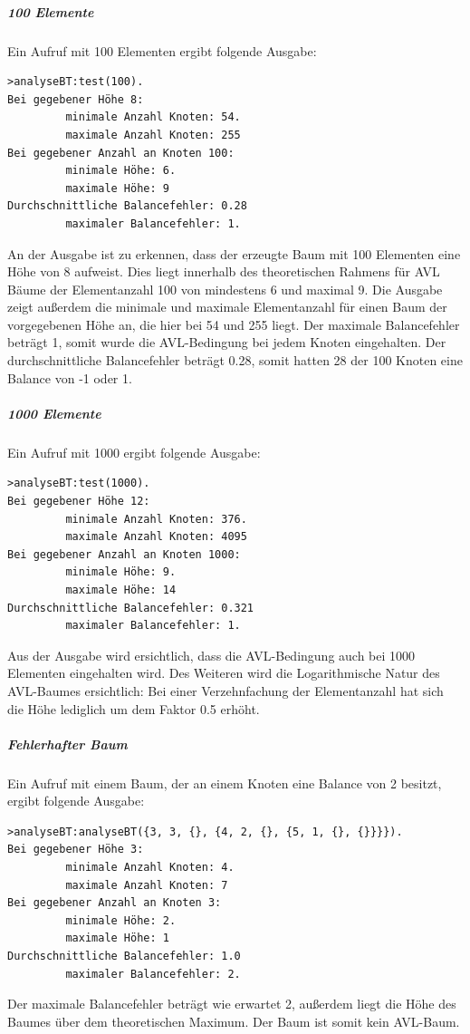 \subparagraph{100 Elemente}
Ein Aufruf mit 100 Elementen ergibt folgende Ausgabe:
\begin{verbatim}
>analyseBT:test(100).
Bei gegebener Höhe 8:
         minimale Anzahl Knoten: 54.
         maximale Anzahl Knoten: 255
Bei gegebener Anzahl an Knoten 100:
         minimale Höhe: 6.
         maximale Höhe: 9
Durchschnittliche Balancefehler: 0.28
         maximaler Balancefehler: 1.
\end{verbatim}

An der Ausgabe ist zu erkennen, dass der erzeugte Baum mit 100 Elementen eine Höhe von 8
aufweist.
Dies liegt innerhalb des theoretischen Rahmens für AVL Bäume der Elementanzahl 100 von mindestens
6 und maximal 9.
Die Ausgabe zeigt außerdem die minimale und maximale Elementanzahl für einen Baum der
vorgegebenen Höhe an, die hier bei 54 und 255 liegt.
Der maximale Balancefehler beträgt 1, somit wurde die AVL-Bedingung bei jedem Knoten eingehalten.
Der durchschnittliche Balancefehler beträgt 0.28, somit hatten 28 der 100 Knoten eine Balance
von -1 oder 1.

\subparagraph{1000 Elemente}
Ein Aufruf mit 1000 ergibt folgende Ausgabe:
\begin{verbatim}
>analyseBT:test(1000).
Bei gegebener Höhe 12:
         minimale Anzahl Knoten: 376.
         maximale Anzahl Knoten: 4095
Bei gegebener Anzahl an Knoten 1000:
         minimale Höhe: 9.
         maximale Höhe: 14
Durchschnittliche Balancefehler: 0.321
         maximaler Balancefehler: 1.
\end{verbatim}

Aus der Ausgabe wird ersichtlich, dass die AVL-Bedingung auch bei 1000 Elementen eingehalten wird.
Des Weiteren wird die Logarithmische Natur des AVL-Baumes ersichtlich:
Bei einer Verzehnfachung der Elementanzahl hat sich die Höhe lediglich um dem Faktor 0.5 erhöht.

\subparagraph{Fehlerhafter Baum}
Ein Aufruf mit einem Baum, der an einem Knoten eine Balance von 2 besitzt, ergibt folgende Ausgabe:
\begin{verbatim}
>analyseBT:analyseBT({3, 3, {}, {4, 2, {}, {5, 1, {}, {}}}}).
Bei gegebener Höhe 3:
         minimale Anzahl Knoten: 4.
         maximale Anzahl Knoten: 7
Bei gegebener Anzahl an Knoten 3:
         minimale Höhe: 2.
         maximale Höhe: 1
Durchschnittliche Balancefehler: 1.0
         maximaler Balancefehler: 2.
\end{verbatim}
Der maximale Balancefehler beträgt wie erwartet 2, außerdem liegt die Höhe des Baumes über dem
theoretischen Maximum.
Der Baum ist somit kein AVL-Baum.

